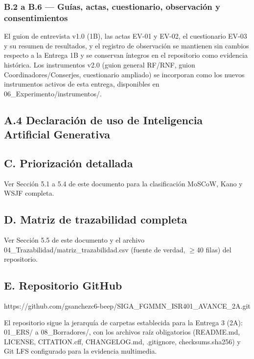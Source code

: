 \subsubsection*{B.2 a B.6 --- Guías, actas, cuestionario, observación y consentimientos}


El guion de entrevista v1.0 (1B), las actas EV-01 y EV-02, el cuestionario EV-03 y su resumen de resultados, y el registro de observación se mantienen sin cambios respecto a la Entrega 1B y se conservan íntegros en el repositorio como evidencia histórica. Los instrumentos v2.0 (guion general RF/RNF, guion Coordinadores/Conserjes, cuestionario ampliado) se incorporan como los nuevos instrumentos activos de esta entrega, disponibles en 06\_Experimento/instrumentos/.


\subsection*{A.4 Declaración de uso de Inteligencia Artificial Generativa}


\subsection*{C. Priorización detallada}


Ver Sección 5.1 a 5.4 de este documento para la clasificación MoSCoW, Kano y WSJF completa.


\subsection*{D. Matriz de trazabilidad completa}


Ver Sección 5.5 de este documento y el archivo 04\_Trazabilidad/matriz\_trazabilidad.csv (fuente de verdad, $\geq$40 filas) del repositorio.


\subsection*{E. Repositorio GitHub}


https://github.com/gsanchezc6-beep/SIGA\_FGMMN\_ISR401\_AVANCE\_2A.git


El repositorio sigue la jerarquía de carpetas establecida para la Entrega 3 (2A): 01\_ERS/ a 08\_Borradores/, con los archivos raíz obligatorios (README.md, LICENSE, CITATION.cff, CHANGELOG.md, .gitignore, checksums.sha256) y Git LFS configurado para la evidencia multimedia.
